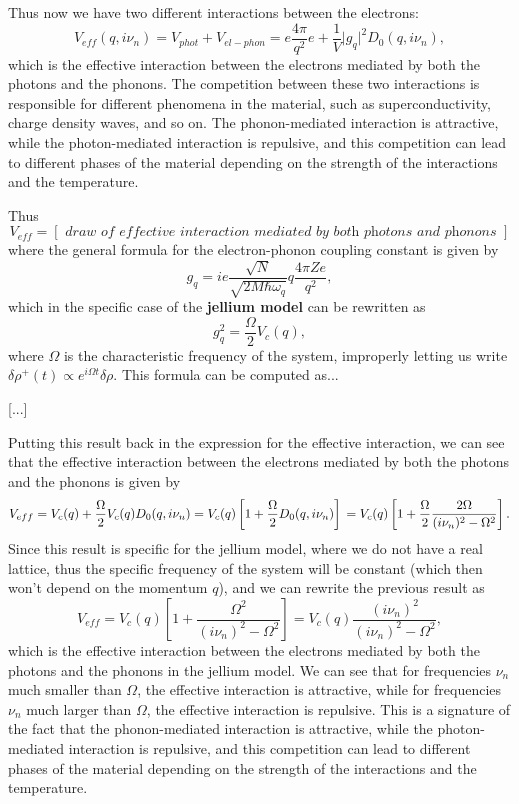 Thus now we have two different interactions between the electrons:
\[
    V_{eff} (q, i \nu_n) = V_{phot} + V_{el-phon} = e \frac{4 \pi}{q^2} e + \frac{1}{V} \vert g_q \vert^2 D_0(q, i \nu_n),
\]
which is the effective interaction between the electrons mediated by both the photons and the phonons. The competition between these two interactions is responsible for different phenomena in the material, such as superconductivity, charge density waves, and so on. The phonon-mediated interaction is attractive, while the photon-mediated interaction is repulsive, and this competition can lead to different phases of the material depending on the strength of the interactions and the temperature.

Thus
\[
    V_{eff} = [\textit{ draw of effective interaction mediated by both photons and phonons }]
\]
where the general formula for the electron-phonon coupling constant is given by
\[
    g_q = i e \frac{\sqrt{N}}{\sqrt{2 M \hbar \omega_q}} q \frac{4 \pi Z e}{q^2},
\]
which in the specific case of the \textbf{jellium model} can be rewritten as
\[
    g^2_q = \frac{\Omega}{2} V_c(q),
\]
where \(\Omega\) is the characteristic frequency of the system, improperly letting us write \(\delta \rho^+ (t) \propto e^{i \Omega t} \delta \rho\). This formula can be computed as...

    [...]

Putting this result back in the expression for the effective interaction, we can see that the effective interaction between the electrons mediated by both the photons and the phonons is given by
\[
    V_{eff} = V_c(q) + \frac{\Omega}{2} V_c(q) D_0(q, i \nu_n) = V_c(q) \left[ 1 + \frac{\Omega}{2} D_0(q, i \nu_n) \right] \\
    = V_c(q) \left[ 1 + \frac{\Omega}{2} \frac{2 \Omega}{(i \nu_n)^2 - \Omega^2} \right].
\]
Since this result is specific for the jellium model, where we do not have a real lattice, thus the specific frequency of the system will be constant (which then won't depend on the momentum \(q\)), and we can rewrite the previous result as
\[
    V_{eff} = V_c(q) \left[ 1 + \frac{\Omega^2}{(i \nu_n)^2 - \Omega^2} \right] = V_c(q) \frac{(i \nu_n)^2}{(i \nu_n)^2 - \Omega^2},
\]
which is the effective interaction between the electrons mediated by both the photons and the phonons in the jellium model. We can see that for frequencies \(\nu_n\) much smaller than \(\Omega\), the effective interaction is attractive, while for frequencies \(\nu_n\) much larger than \(\Omega\), the effective interaction is repulsive. This is a signature of the fact that the phonon-mediated interaction is attractive, while the photon-mediated interaction is repulsive, and this competition can lead to different phases of the material depending on the strength of the interactions and the temperature.


